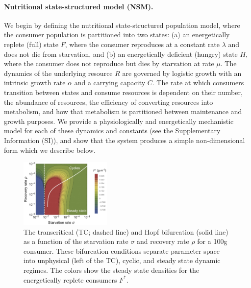 \documentclass[twocolumn,preprintnumbers,amsmath,amssymb,superscriptaddress]{revtex4}
\begin{document}
\noindent \paragraph*{{\bf Nutritional state-structured model (NSM).}}
We begin by defining the nutritional state-structured population model, where the consumer population is partitioned into two states: (a) an
energetically replete (full) state $F$, where the consumer reproduces at a
constant rate $\lambda$ and does not die from starvation, and (b) an
energetically deficient (hungry) state $H$, where the consumer does not
reproduce but dies by starvation at rate $\mu$. The dynamics of the
underlying resource $R$ are governed by logistic growth with an intrinsic
growth rate $\alpha$ and a carrying capacity $C$. The rate at which consumers
transition between states and consume resources is dependent on their number,
the abundance of resources, the efficiency of converting resources into
metabolism, and how that metabolism is partitioned between maintenance and
growth purposes.  We provide a physiologically and energetically mechanistic
model for each of these dynamics and constants (see the Supplementary Information
(SI)), and show that the system produces a simple non-dimensional form which
we describe below.

\begin{figure}
\centering
\includegraphics[width=0.4\textwidth]{fig_FixedPoint2.eps}
\caption{\small{ The transcritical (TC; dashed line) and Hopf bifurcation (solid line) as a
  function of the starvation rate $\sigma$ and recovery rate $\rho$ for a 100g consumer.  These
  bifurcation conditions separate parameter space into unphysical (left of the TC), cyclic,
  and steady state dynamic regimes.  The colors show the steady state densities for the energetically replete consumers $F^*$.  
}\label{fig:fp}}
\end{figure}
\end{document}
